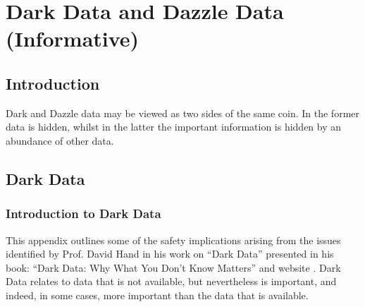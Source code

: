 %
%
\section{Dark Data and Dazzle Data (Informative)}%
\label{bkm:darkdazzledata}
%

\subsection{Introduction}
Dark and Dazzle data may be viewed as two sides of the same coin. In the former data is hidden, whilst in the latter the important \gls{information} is hidden by an abundance of other data.

\subsection{Dark Data}%
%
\label{bkm:darkdata}
%
\subsubsection{Introduction to Dark Data}
This appendix outlines some of the safety implications arising from the issues identified by Prof. David Hand in his work on ``Dark Data'' presented in his book: ``Dark Data: Why What You Don't Know Matters'' \cite{citation:darkdata:hand} and website \cite{citation:darkdata:website}. Dark Data relates to data that is not available, but nevertheless is important, and indeed, in some cases, more important than the data that is available.


